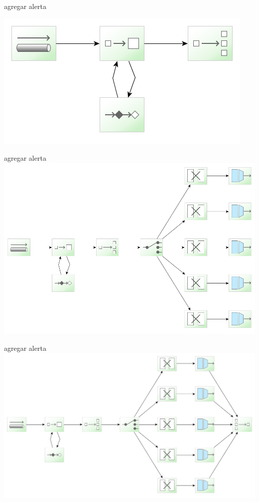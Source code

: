 \documentclass{beamer}
\begin{document}
\begin{frame}{agregar alerta}
\begin{center}
\includegraphics[width=0.6\linewidth]{sp-int-27}
\end{center}
\end{frame}

\begin{frame}{agregar alerta}
\includegraphics[width=0.9\linewidth]{sp-int-28}
\end{frame}

\begin{frame}{agregar alerta}
\includegraphics[width=1.0\linewidth]{sp-int-29}
\end{frame}
\end{document}
